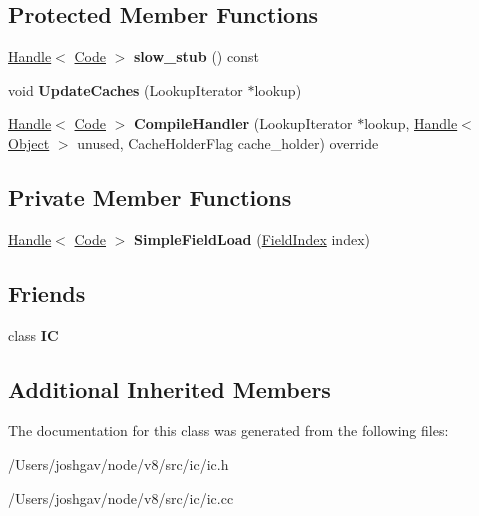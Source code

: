\subsection*{Protected Member Functions}
\begin{DoxyCompactItemize}
\item 
\hyperlink{classv8_1_1internal_1_1_handle}{Handle}$<$ \hyperlink{classv8_1_1internal_1_1_code}{Code} $>$ {\bfseries slow\+\_\+stub} () const \hypertarget{classv8_1_1internal_1_1_load_i_c_a2c0196a280a99bf08f24f50e3c34352f}{}\label{classv8_1_1internal_1_1_load_i_c_a2c0196a280a99bf08f24f50e3c34352f}

\item 
void {\bfseries Update\+Caches} (Lookup\+Iterator $\ast$lookup)\hypertarget{classv8_1_1internal_1_1_load_i_c_a16c61b33868d2d10cd64a1acff513cb8}{}\label{classv8_1_1internal_1_1_load_i_c_a16c61b33868d2d10cd64a1acff513cb8}

\item 
\hyperlink{classv8_1_1internal_1_1_handle}{Handle}$<$ \hyperlink{classv8_1_1internal_1_1_code}{Code} $>$ {\bfseries Compile\+Handler} (Lookup\+Iterator $\ast$lookup, \hyperlink{classv8_1_1internal_1_1_handle}{Handle}$<$ \hyperlink{classv8_1_1internal_1_1_object}{Object} $>$ unused, Cache\+Holder\+Flag cache\+\_\+holder) override\hypertarget{classv8_1_1internal_1_1_load_i_c_abb326f1928906008be668b1bd963ed7f}{}\label{classv8_1_1internal_1_1_load_i_c_abb326f1928906008be668b1bd963ed7f}

\end{DoxyCompactItemize}
\subsection*{Private Member Functions}
\begin{DoxyCompactItemize}
\item 
\hyperlink{classv8_1_1internal_1_1_handle}{Handle}$<$ \hyperlink{classv8_1_1internal_1_1_code}{Code} $>$ {\bfseries Simple\+Field\+Load} (\hyperlink{classv8_1_1internal_1_1_field_index}{Field\+Index} index)\hypertarget{classv8_1_1internal_1_1_load_i_c_a7cc541429fe260faad4198f524291700}{}\label{classv8_1_1internal_1_1_load_i_c_a7cc541429fe260faad4198f524291700}

\end{DoxyCompactItemize}
\subsection*{Friends}
\begin{DoxyCompactItemize}
\item 
class {\bfseries IC}\hypertarget{classv8_1_1internal_1_1_load_i_c_ae59e849648858af1fd22081890d47b78}{}\label{classv8_1_1internal_1_1_load_i_c_ae59e849648858af1fd22081890d47b78}

\end{DoxyCompactItemize}
\subsection*{Additional Inherited Members}


The documentation for this class was generated from the following files\+:\begin{DoxyCompactItemize}
\item 
/\+Users/joshgav/node/v8/src/ic/ic.\+h\item 
/\+Users/joshgav/node/v8/src/ic/ic.\+cc\end{DoxyCompactItemize}
